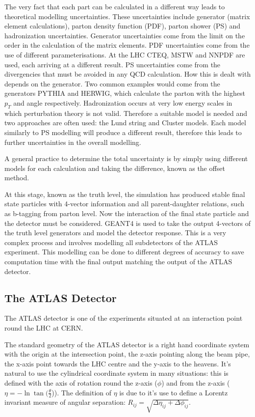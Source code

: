 The very fact that each part can be calculated in a different way leads to theoretical modelling uncertainties. These uncertainties include generator (matrix element calculations), parton density function (PDF), parton shower (PS) and hadronization uncertainties. 
Generator uncertainties come from the limit on the order in the calculation of the matrix elements. PDF uncertainties come from the use of different parameterisations. At the LHC CTEQ, MSTW and NNPDF are used, each arriving at a different result. PS uncertainties come from the divergencies that must be avoided in any QCD calculation. How this is dealt with depends on the generator. Two common examples would come from the generators PYTHIA and HERWIG, which calculate the parton with the highest $p_T$ and angle respectively. Hadronization occurs at very low energy scales in which perturbation theory is not valid. Therefore a suitable model is needed and two approaches are often used: the Lund string and Cluster models. Each model similarly to PS modelling will produce a different result, therefore this leads to further uncertainties in the overall modelling. 

A general practice to determine the total uncertainty is by simply using different models for each calculation and taking the difference, known as the offset method. 

At this stage, known as the truth level, the simulation has produced stable final state particles with 4-vector information and all parent-daughter relations, such as b-tagging from parton level. Now the interaction of the final state particle and the detector must be considered.       
GEANT4 is used to take the output 4-vectors of the truth level generators and model the detector response. This is a very complex process and involves modelling all subdetectors of the ATLAS experiment. This modelling can be done to different degrees of accuracy to save computation time with the final output matching the output of the ATLAS detector. 
 
\subsection{The ATLAS Detector}
\label{atlasdetector}
The ATLAS detector is one of the experiments situated at an interaction point round the LHC at CERN.


The standard geometry of the ATLAS detector is a right hand coordinate system with the origin at the intersection point, the z-axis pointing along the beam pipe, the x-axis point towards the LHC centre and the y-axis to the heavens. It's natural to use the cylindrical coordinate system in many situations: this is defined with the axis of rotation round the z-axis ($\phi$) and from the z-axis ($\eta=-\ln\tan (\frac{\theta}{2}$)). The definition of $\eta$ is due to it's use to define a Lorentz invariant measure of angular separation: $R_{ij}=\sqrt{\Delta\eta_{ij} + \Delta\phi_{ij}}$.

